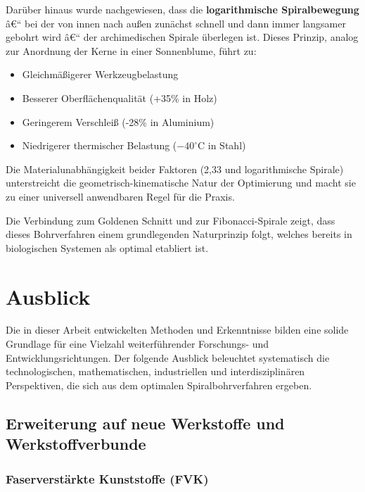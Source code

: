 ﻿\documentclass[12pt,a4paper]{article}
\begin{document}
Darüber hinaus wurde nachgewiesen, dass die \textbf{logarithmische Spiralbewegung} â€“ bei der von innen nach außen zunächst schnell und dann immer langsamer gebohrt wird â€“ der archimedischen Spirale überlegen ist. Dieses Prinzip, analog zur Anordnung der Kerne in einer Sonnenblume, führt zu:

\begin{itemize}
	\item Gleichmäßigerer Werkzeugbelastung
	\item Besserer Oberflächenqualität (+35\% in Holz)
	\item Geringerem Verschleiß (-28\% in Aluminium)
	\item Niedrigerer thermischer Belastung ($-40^\circ\text{C}$ in Stahl)
\end{itemize}

Die Materialunabhängigkeit beider Faktoren (2,33 und logarithmische Spirale) unterstreicht die geometrisch-kinematische Natur der Optimierung und macht sie zu einer universell anwendbaren Regel für die Praxis.

Die Verbindung zum Goldenen Schnitt und zur Fibonacci-Spirale zeigt, dass dieses Bohrverfahren einem grundlegenden Naturprinzip folgt, welches bereits in biologischen Systemen als optimal etabliert ist.


\section{Ausblick}

Die in dieser Arbeit entwickelten Methoden und Erkenntnisse bilden eine solide Grundlage für eine Vielzahl weiterführender Forschungs- und Entwicklungsrichtungen. Der folgende Ausblick beleuchtet systematisch die technologischen, mathematischen, industriellen und interdisziplinären Perspektiven, die sich aus dem optimalen Spiralbohrverfahren ergeben.

\subsection{Erweiterung auf neue Werkstoffe und Werkstoffverbunde}

\subsubsection{Faserverstärkte Kunststoffe (FVK)}
\end{document}

